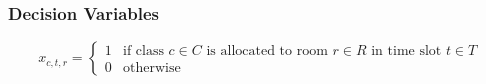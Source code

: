 \subsubsection*{Decision Variables}

\begin{equation*}
x_{c, t, r} = \begin{cases}
1 & \text{if class $c \in C$ is allocated to room $r \in R$ in time slot $t\in T$} \\
0 & \text{otherwise}
\end{cases}
\end{equation*}
